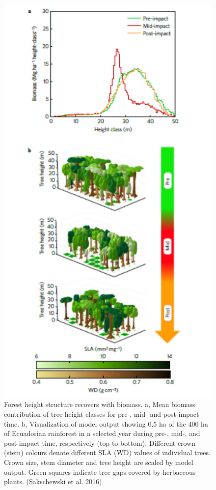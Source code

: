 \documentclass[
  12pt,
  oneside]{book}
\begin{document}
\begin{figure}

{\centering \includegraphics[width=0.8\linewidth]{figures/chap7/f721_lpjML_2} 

}

\caption{Forest height structure recovers with biomass. a, Mean biomass contribution of tree height classes for pre-, mid- and post-impact time. b, Visualization of model output showing 0.5 ha of the 400 ha of Ecuadorian rainforest in a selected year during pre-, mid-, and post-impact time, respectively (top to bottom). Different crown (stem) colours denote different SLA (WD) values of individual trees. Crown size, stem diameter and tree height are scaled by model output. Green squares indicate tree gaps covered by herbaceous plants. (Sakschewski et al. 2016)}\label{fig:f721}
\end{figure}
\end{document}
